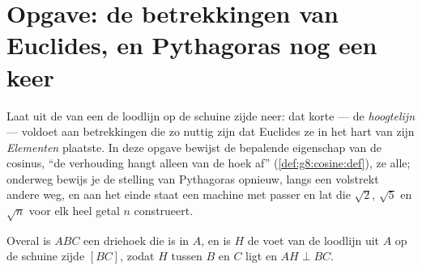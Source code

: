 \section{Opgave: de betrekkingen van Euclides, en Pythagoras nog een keer}

\begin{problem}[{Weekendopgave --- de hoogtelijn van een rechthoekige driehoek:
$AB^2 = BH \times BC$, $AH^2 = BH \times HC$, een tweede bewijs van Pythagoras,
en een machine om vierkantswortels te construeren}]
\label{pb:g8:cosine:1}
Laat uit de  van een  de loodlijn op de schuine
zijde neer: dat korte  --- de \emph{hoogtelijn} --- voldoet aan
betrekkingen die zo nuttig zijn dat Euclides ze in het hart van zijn
\emph{Elementen} plaatste. In deze opgave bewijst de bepalende eigenschap van de
cosinus, ``de verhouding hangt alleen van de hoek af''
(\cref{def:g8:cosine:def}), ze alle; onderweg bewijs je de stelling van
Pythagoras opnieuw, langs een volstrekt andere weg, en aan het einde staat een
machine met passer en lat die $\sqrt2$, $\sqrt5$ en $\sqrt{n}$ voor elk heel
getal $n$ construeert.

Overal is $ABC$ een driehoek die  is in $A$, en is $H$ de voet van de
loodlijn uit $A$ op de schuine zijde $[BC]$, zodat $H$ tussen $B$ en $C$ ligt en
$AH \perp BC$.


\end{problem}
